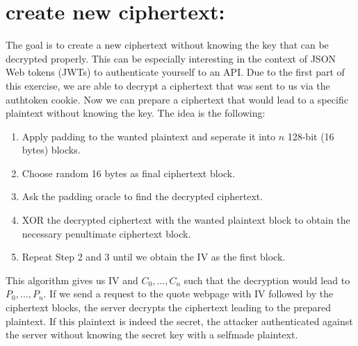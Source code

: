 \documentclass{article}
\begin{document}
\section{create new ciphertext:}

The goal is to create a new ciphertext without knowing the key that can be decrypted properly. This can be especially interesting in the context of JSON Web tokens (JWTs) to authenticate yourself to an API. Due to the first part of this exercise, we are able to decrypt a ciphertext that was sent to us via the authtoken cookie. Now we can prepare a ciphertext that would lead to a specific plaintext without knowing the key. The idea is the following:
\begin{enumerate}
    \item Apply padding to the wanted plaintext and seperate it into $n$ 128-bit (16 bytes) blocks.
    \item Choose random 16 bytes as final ciphertext block.
    \item Ask the padding oracle to find the decrypted ciphertext.
    \item XOR the decrypted ciphertext with the wanted plaintext block to obtain the necessary penultimate ciphertext block.
    \item Repeat Step 2 and 3 until we obtain the IV as the first block.
\end{enumerate}
This algorithm gives us IV and $C_0, \dots , C_n$ such that the decryption would lead to $P_0, \dots , P_n$. If we send a request to the quote webpage with IV followed by the ciphertext blocks, the server decrypts the ciphertext leading to the prepared plaintext. If this plaintext is indeed the secret, the attacker authenticated against the server without knowing the secret key with a selfmade plaintext. 
\end{document}

